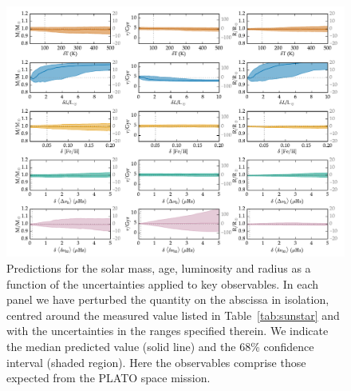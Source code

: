 \begin{figure}
    \centering
    \includegraphics[width=0.95\textheight,height=0.95\textwidth,keepaspectratio, angle=90]{plato2.pdf}
    \caption{Predictions for the solar mass, age, luminosity and radius as a function of the uncertainties applied to key observables. In each panel we have perturbed the quantity on the abscissa in isolation, centred around the measured value listed in  Table~\ref{tab:sunstar} and with the uncertainties in the ranges specified therein. We indicate the median predicted value (solid line) and the 68\%  confidence interval (shaded region). Here the observables comprise those expected from the PLATO space mission.} 
    \label{fig:uncertplato}
\end{figure}
\fi

%


